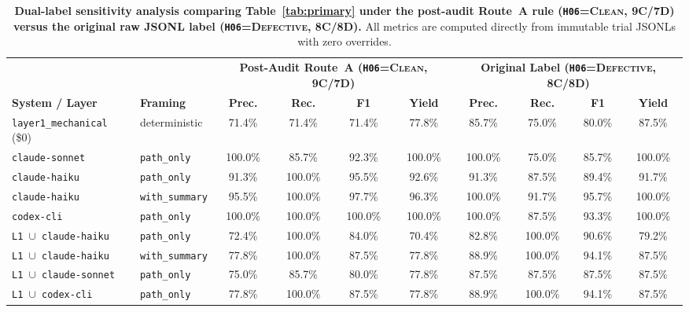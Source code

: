 \begin{table}[h]
\centering
\caption{\textbf{Dual-label sensitivity analysis comparing Table~\ref{tab:primary} under the post-audit Route~A rule (\texttt{H06}=\textsc{Clean}, 9C/7D) versus the original raw JSONL label (\texttt{H06}=\textsc{Defective}, 8C/8D).} All metrics are computed directly from immutable trial JSONLs with zero overrides.}
\label{tab:app_sensitivity}
\setlength{\tabcolsep}{3.8pt}
\scriptsize
\begin{tabular}{llcccc|cccc}
\toprule
 & & \multicolumn{4}{c|}{\textbf{Post-Audit Route~A (\texttt{H06}=\textsc{Clean}, 9C/7D)}} & \multicolumn{4}{c}{\textbf{Original Label (\texttt{H06}=\textsc{Defective}, 8C/8D)}} \\
\textbf{System / Layer} & \textbf{Framing} & \textbf{Prec.} & \textbf{Rec.} & \textbf{F1} & \textbf{Yield} & \textbf{Prec.} & \textbf{Rec.} & \textbf{F1} & \textbf{Yield} \\
\midrule
\texttt{layer1\_mechanical} (\$0) & deterministic & 71.4\% & 71.4\% & 71.4\% & 77.8\% & 85.7\% & 75.0\% & 80.0\% & 87.5\% \\
\texttt{claude-sonnet}            & \texttt{path\_only} & 100.0\% & 85.7\% & 92.3\% & 100.0\% & 100.0\% & 75.0\% & 85.7\% & 100.0\% \\
\texttt{claude-haiku}             & \texttt{path\_only} & 91.3\% & 100.0\% & 95.5\% & 92.6\% & 91.3\% & 87.5\% & 89.4\% & 91.7\% \\
\texttt{claude-haiku}             & \texttt{with\_summary} & 95.5\% & 100.0\% & 97.7\% & 96.3\% & 100.0\% & 91.7\% & 95.7\% & 100.0\% \\
\texttt{codex-cli}                & \texttt{path\_only} & 100.0\% & 100.0\% & 100.0\% & 100.0\% & 100.0\% & 87.5\% & 93.3\% & 100.0\% \\
\midrule
\texttt{L1 $\cup$ claude-haiku}   & \texttt{path\_only} & 72.4\% & 100.0\% & 84.0\% & 70.4\% & 82.8\% & 100.0\% & 90.6\% & 79.2\% \\
\texttt{L1 $\cup$ claude-haiku}   & \texttt{with\_summary} & 77.8\% & 100.0\% & 87.5\% & 77.8\% & 88.9\% & 100.0\% & 94.1\% & 87.5\% \\
\texttt{L1 $\cup$ claude-sonnet}  & \texttt{path\_only} & 75.0\% & 85.7\% & 80.0\% & 77.8\% & 87.5\% & 87.5\% & 87.5\% & 87.5\% \\
\texttt{L1 $\cup$ codex-cli}      & \texttt{path\_only} & 77.8\% & 100.0\% & 87.5\% & 77.8\% & 88.9\% & 100.0\% & 94.1\% & 87.5\% \\
\bottomrule
\end{tabular}
\end{table}

